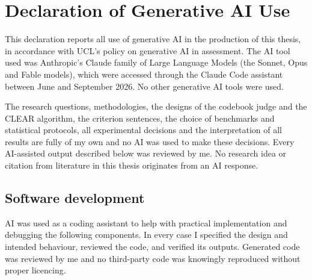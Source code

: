 \documentclass[11pt,a4paper,oneside]{report}
\begin{document}
\FloatBarrier
\clearpage
\chapter*{Declaration of Generative AI Use}

This declaration reports all use of generative AI in the production of this
thesis, in accordance with UCL's policy on generative AI in assessment. The AI tool used was Anthropic's Claude family of
Large Language Models (the Sonnet, Opus and Fable models), which were accessed through
the Claude Code assistant between June and September 2026. No other generative
AI tools were used.

The research questions, methodologies, the designs of the codebook judge and the CLEAR
algorithm, the criterion sentences, the choice of benchmarks and statistical
protocols, all experimental decisions and the interpretation of all results
are fully of my own and no AI was used to make these decisions. Every AI-assisted output described below was reviewed by me. No
research idea or citation from literature in this thesis originates from an AI response.

\section*{Software development}

AI was used as a coding assistant to help with practical implementation and debugging the
following components. In every case I specified the design and intended
behaviour, reviewed the code, and verified its outputs. Generated code was
reviewed by me and no third-party code was knowingly reproduced without proper 
licencing.
\end{document}
